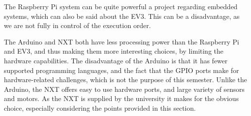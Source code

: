 The Raspberry Pi system can be quite powerful a project regarding embedded systems, which can also be said about the EV3.
This can be a disadvantage, as we are not fully in control of the execution order.

The Arduino and NXT both have less processing power than the Raspberry Pi and EV3, and thus making them more interesting choices, by limiting the hardware capabilities.
The disadvantage of the Arduino is that it has fewer supported programming languages, and the fact that the GPIO ports make for hardware-related challenges, which is not the purpose of this semester.
Unlike the Arduino, the NXT offers easy to use hardware ports, and large variety of sensors and motors.
As the NXT is supplied by the university it makes for the obvious choice, especially considering the points provided in this section.
